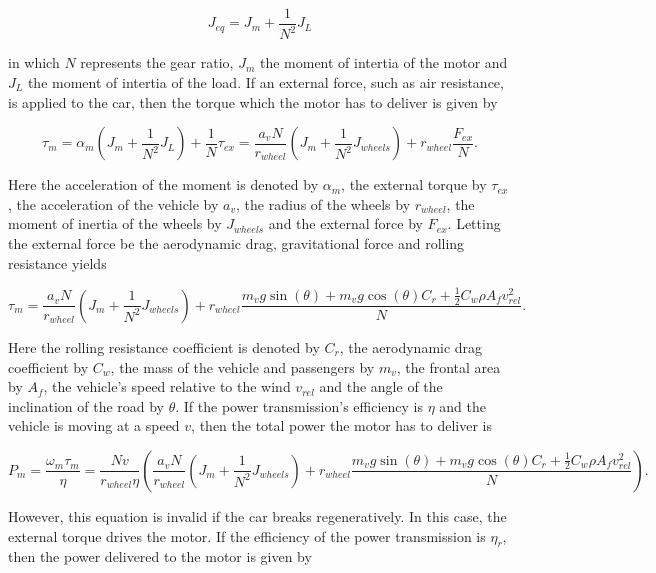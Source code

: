 \documentclass[11pt,titlepage]{report}
\begin{document}
\begin{equation}
	J_{eq} = J_m + \frac{1}{N^2} J_L
\end{equation}

in which $N$ represents the gear ratio, $J_m$ the moment of intertia of the motor and $J_L$ the moment of intertia of the load. If an external force, such as air resistance, is applied to the car, then the torque which the motor has to deliver is given by

\begin{equation} \label{eq:ass-4-eq-torque}
	\tau_{m} = \alpha_m (J_m + \frac{1}{N^2} J_L) + \frac{1}{N} \tau_{ex} =
	\frac{a_v N}{r_{wheel}} (J_m + \frac{1}{N^2} J_{wheels}) + r_{wheel} \frac{F_{ex}}{N}.
\end{equation}

Here the acceleration of the moment is denoted by $\alpha_m$, the external torque by $\tau_{ex}$, the acceleration of the vehicle by $a_v$, the radius of the wheels by $r_{wheel}$, the moment of inertia of the wheels by $J_{wheels}$ and the external force by $F_{ex}$. Letting the external force be the aerodynamic drag, gravitational force and rolling resistance yields

\begin{equation}
	\tau_{m} =
	\frac{a_v N}{r_{wheel}} (J_m + \frac{1}{N^2} J_{wheels}) + r_{wheel} \frac{
		m_v g \sin{(\theta)} +
		m_v g \cos{(\theta)} C_r +
		\frac{1}{2} C_w \rho A_f v_{rel}^2
	}{N}.
\end{equation}

Here the rolling resistance coefficient is denoted by $C_r$, the aerodynamic drag coefficient by $C_w$, the mass of the vehicle and passengers by $m_v$, the frontal area by $A_f$, the vehicle's speed relative to the wind $v_{rel}$ and the angle of the inclination of the road by $\theta$. If the power transmission's efficiency is $\eta$ and the vehicle is moving at a speed $v$, then the total power the motor has to deliver is

\begin{equation} \label{eq:ass-3-driving}
	P_{m} = \frac{\omega_m \tau_{m}}{\eta} =
	\frac{N v}{r_{wheel} \eta} \left(
		\frac{a_v N}{r_{wheel}} (J_m + \frac{1}{N^2} J_{wheels}) + r_{wheel} \frac{
			m_v g \sin{(\theta)} +
			m_v g \cos{(\theta)} C_r +
			\frac{1}{2} C_w \rho A_f v_{rel}^2
		}{N}
	\right).
\end{equation}

However, this equation is invalid if the car breaks regeneratively. In this case, the external torque drives the motor. If the efficiency of the power transmission is $\eta_r$, then the power delivered to the motor is given by
\end{document}
